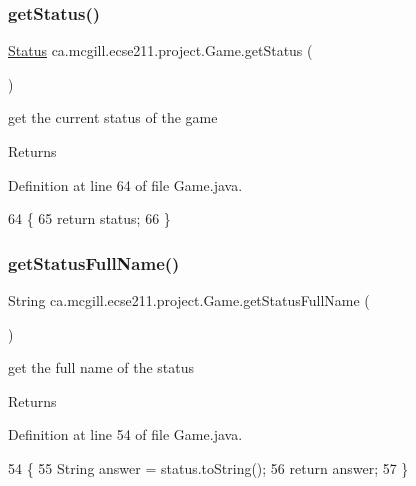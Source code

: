 \subsubsection{\texorpdfstring{get\+Status()}{getStatus()}}
{\footnotesize\ttfamily \hyperlink{enumca_1_1mcgill_1_1ecse211_1_1project_1_1_game_1_1_status}{Status} ca.\+mcgill.\+ecse211.\+project.\+Game.\+get\+Status (\begin{DoxyParamCaption}{ }\end{DoxyParamCaption})}

get the current status of the game

\begin{DoxyReturn}{Returns}

\end{DoxyReturn}


Definition at line 64 of file Game.\+java.


\begin{DoxyCode}
64                             \{
65     \textcolor{keywordflow}{return} status;
66   \}
\end{DoxyCode}
\mbox{\label{enumca_1_1mcgill_1_1ecse211_1_1project_1_1_game_a43a5763d183e0bcacd402c872c07273e}} 
\subsubsection{\texorpdfstring{get\+Status\+Full\+Name()}{getStatusFullName()}}
{\footnotesize\ttfamily String ca.\+mcgill.\+ecse211.\+project.\+Game.\+get\+Status\+Full\+Name (\begin{DoxyParamCaption}{ }\end{DoxyParamCaption})}

get the full name of the status

\begin{DoxyReturn}{Returns}

\end{DoxyReturn}


Definition at line 54 of file Game.\+java.


\begin{DoxyCode}
54                                     \{
55     String answer = status.toString();
56     \textcolor{keywordflow}{return} answer;
57   \}
\end{DoxyCode}
\mbox{\label{enumca_1_1mcgill_1_1ecse211_1_1project_1_1_game_a6b4c0cfb8de83ba7c6d5dfb24882dc5a}} 
